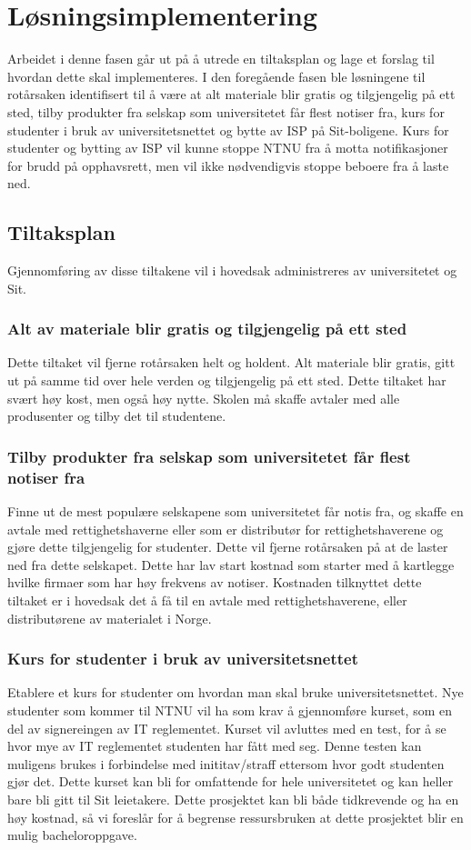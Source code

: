 \chapter{Løsningsimplementering}
Arbeidet i denne fasen går ut på å utrede en tiltaksplan og lage et forslag til hvordan dette skal implementeres. I den foregående fasen ble løsningene til rotårsaken identifisert til å være at alt materiale blir gratis og tilgjengelig på ett sted, tilby produkter fra selskap som universitetet får flest notiser fra, kurs for studenter i bruk av universitetsnettet og bytte av ISP på Sit-boligene. Kurs for studenter og bytting av ISP vil kunne stoppe NTNU fra å motta notifikasjoner for brudd på opphavsrett, men vil ikke nødvendigvis stoppe beboere fra å laste ned. 

\section{Tiltaksplan}
Gjennomføring av disse tiltakene vil i hovedsak administreres av universitetet og Sit.

\subsection{Alt av materiale blir gratis og tilgjengelig på ett sted}
Dette tiltaket vil fjerne rotårsaken helt og holdent. Alt materiale blir gratis, gitt ut på samme tid over hele verden og tilgjengelig på ett sted. Dette tiltaket har svært høy kost, men også høy nytte. Skolen må skaffe avtaler med alle produsenter og tilby det til studentene. 

\subsection{Tilby produkter fra selskap som universitetet får flest notiser fra}
Finne ut de mest populære selskapene som universitetet får notis fra, og skaffe en avtale med rettighetshaverne eller som er distributør for rettighetshaverene og gjøre dette tilgjengelig for studenter. Dette vil fjerne rotårsaken på at de laster ned fra dette selskapet. Dette har lav start kostnad som starter med å kartlegge hvilke firmaer som har høy frekvens av notiser. Kostnaden tilknyttet dette tiltaket er i hovedsak det å få til en avtale med rettighetshaverene, eller distributørene av materialet i Norge.

\subsection{Kurs for studenter i bruk av universitetsnettet}
Etablere et kurs for studenter om hvordan man skal bruke universitetsnettet. Nye studenter som kommer til NTNU vil ha som krav å gjennomføre kurset, som en del av signereingen av IT reglementet. Kurset vil avluttes med en test, for å se hvor mye av IT reglementet studenten har fått med seg. Denne testen kan muligens brukes i forbindelse med inititav/straff ettersom hvor godt studenten gjør det. Dette kurset kan bli for omfattende for hele universitetet og kan heller bare bli gitt til Sit leietakere. Dette prosjektet kan bli både tidkrevende og ha en høy kostnad, så vi foreslår for å begrense ressursbruken at dette prosjektet blir en mulig bacheloroppgave.   

